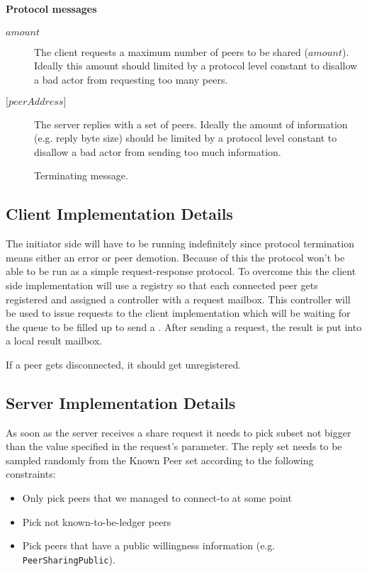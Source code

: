 \paragraph{Protocol messages}
\begin{description}
\item [\MsgShareRequest{} $amount$]
  The client requests a maximum number of peers to be shared ($amount$). Ideally this
  amount should limited by a protocol level constant to disallow a bad actor from
  requesting too many peers.
\item [\MsgSharePeers{} ${[}peerAddress{]}$]
  The server replies with a set of peers. Ideally the amount of information (e.g. reply
  byte size) should be limited by a protocol level constant to disallow a bad actor from
  sending too much information.
\item [\MsgDone]
  Terminating message.
\end{description}

\subsection{Client Implementation Details}

The initiator side will have to be running indefinitely since protocol termination means
either an error or peer demotion. Because of this the protocol won't be able to be run as
a simple request-response protocol. To overcome this the client side implementation will
use a registry so that each connected peer gets registered and assigned a controller with
a request mailbox. This controller will be used to issue requests to the client
implementation which will be waiting for the queue to be filled up to send a
\MsgShareRequest. After sending a request, the result is put into a local result mailbox.

If a peer gets disconnected, it should get unregistered.

\subsection{Server Implementation Details}

As soon as the server receives a share request it needs to pick subset not bigger than the
value specified in the request's parameter. The reply set needs to be sampled randomly
from the Known Peer set according to the following constraints:

\begin{itemize}
  \item Only pick peers that we managed to connect-to at some point
  \item Pick not known-to-be-ledger peers
  \item Pick peers that have a public willingness information (e.g. \texttt{PeerSharingPublic}).
\end{itemize}

